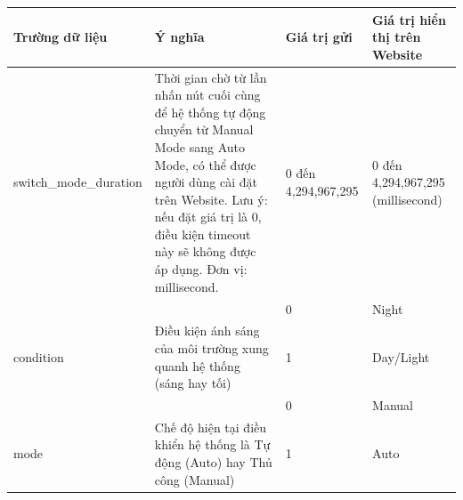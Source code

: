 \begin{table}[H]
\centering
\small
\begin{tabular}{|p{4cm}|p{5cm}|p{2.5cm}|p{3.5cm}|}
\hline
{\textbf{Trường dữ liệu}}        & {\textbf{Ý nghĩa}}                                                                                                                                                                                                                              & {\textbf{Giá trị gửi}} & {\textbf{Giá trị hiển thị trên Website}}                                  \\ \hline
{switch\_mode\_duration}         & {Thời gian chờ từ lần nhấn nút cuối cùng để hệ thống tự động chuyển từ Manual Mode sang Auto Mode, có thể được người dùng cài đặt trên Website. Lưu ý: nếu đặt giá trị là 0, điều kiện timeout này sẽ không được áp dụng. Đơn vị: millisecond.} & {0 đến 4,294,967,295}  & {0 đến 4,294,967,295 (millisecond)}                                       \\ \hline
{}                               & {}                                                                                                                                                                                                                                              & {0}                    & {Night}                                                                   \\ \cline{3-4} 
\multirow{-2}{*}{condition}    & {Điều kiện ánh sáng của môi trường xung quanh hệ thống (sáng hay tối)}                                                                                                                                                        & {1}                    & {Day/Light}                                                               \\ \hline
{}                               & {}                                                                                                                                                                                                                                              & {0}                    & {Manual}                                                                  \\ \cline{3-4} 
\multirow{-2}{*}{{mode}}         & {{Chế độ hiện tại điều khiển hệ thống là Tự động (Auto) hay Thủ công (Manual)}}                                                                                                                                                 & {1}                    & {Auto}                                                                    \\ \hline

\end{tabular}
\end{table}
